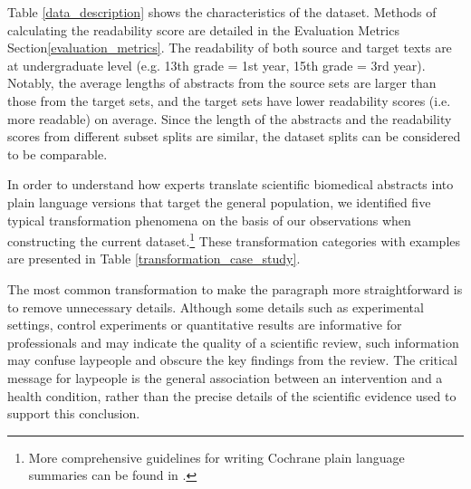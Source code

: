 \documentclass[letterpaper, table]{article} %
\begin{document}
Table \ref{data_description} shows the characteristics of the dataset. Methods of calculating the readability score are detailed in the Evaluation Metrics Section\ref{evaluation_metrics}. The readability of both source and target texts are at undergraduate level (e.g. 13th grade = 1st year, 15th grade = 3rd year). Notably, the average lengths of abstracts from the source sets are larger than those from the target sets, and the target sets have lower readability scores (i.e. more readable) on average. Since the length of the abstracts and the readability scores from different subset splits are similar, the dataset splits can be considered to be comparable.



In order to understand how experts translate scientific biomedical abstracts into plain language versions that target the general population, we identified five typical transformation phenomena on the basis of our observations when constructing the current dataset.\footnote{More comprehensive guidelines for writing Cochrane plain language summaries can be found in \citet{mcilwain2014standards}.} These transformation categories with examples are presented in Table \ref{transformation_case_study}.

The most common transformation to make the paragraph more straightforward is to remove unnecessary details. Although some details such as experimental settings, control experiments or quantitative results are informative for professionals and may indicate the quality of a scientific review, such information
may confuse laypeople and obscure the key findings from the review.
The critical message for laypeople is the general association between an intervention and a health condition, rather than the precise details of the scientific evidence used to support this conclusion.
\end{document}
